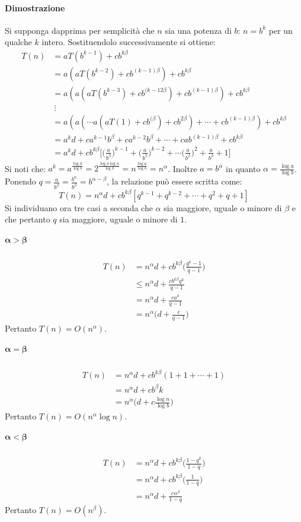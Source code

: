 \paragraph{Dimostrazione}\mbox{}
Si supponga dapprima per semplicit\`a che $n$ sia una potenza di $b$: $n = b^k$ per un qualche $k$ intero. Sostituendolo successivamente si ottiene: 
\begin{align*}
	T(n) &= aT(b^{k-1}) + cb^{k\beta} \\
	     &= a(aT(b^{k-2}) + cb^{(k-1)\beta}) + cb^{k\beta}\\
	     &= a(a(aT(b^{k-3}) + cb^{(k-12\beta}) + cb^{(k-1)\beta}) + cb^{k\beta}\\
	     &\ \vdots \\
	     &= a(a(\cdots a(aT(1) + cb^{(\beta}) + cb^{2\beta})+\cdots+cb^{(k-1)\beta})+cb^{k\beta}\\
	     &= a^kd + ca^{k-1}b^\beta + ca^{k-2}b^\beta + \cdots + cab^{(k-1)\beta} + cb^{k\beta}\\
	     &= a^kd + cb^{k\beta}\biggl[\biggl(\frac{a}{b^\beta}\biggr)^{k-1} + \biggl(\frac{a}{b^\beta}\biggr)^{k-2} + \cdots \biggl(\frac{a}{b^\beta}\biggr)^{2} + \frac{a}{b^\beta} + 1
	     	\biggr]
\end{align*}
Si noti che: $a^k = a^{\frac{\log n}{\log b}}= 2^{\frac{\log a \log n}{\log b}} = n^{\frac{\log a}{\log b}} = n^\alpha$. Inoltre $a = b^\alpha$ in quanto $\alpha = \frac{\log a}{\log b}$.
Ponendo $q = \frac{a}{b^\beta} = \frac{b^\alpha}{b^\beta} = b^{\alpha - \beta}$, la relazione pu\`o essere scritta come: 
$$ T(n) = n^\alpha d + cb^{k\beta}[q^{k-1} + q^{k-2} + \cdots + q^2 + q + 1]$$
Si individuano ora tre casi a seconda che $\alpha$ sia maggiore, uguale o minore di $\beta$ e che pertanto $q$ sia maggiore, uguale o minore di $1$. 
\subparagraph{$\mathbf{\alpha > \beta}$}
\begin{align*}
	T(n) &= n^\alpha d + cb^{k\beta}\biggl(\frac{q^k - 1}{q -1}\biggr)\\
	     &\le n^\alpha d + \frac{cb^{k\beta}q^k}{q-1}\\
	     &= n^\alpha d + \frac{ca^k}{q-1}\\
	     &=  n^\alpha\biggl(d + \frac{c}{q-1}\biggr)
\end{align*}
Pertanto $T(n) = O(n^\alpha)$.
\subparagraph{$\mathbf{\alpha = \beta}$}
\begin{align*}
	T(n) &= n^\alpha d + cb^{k\beta}(1+1+\cdots+1)\\
	     &= n^\alpha d +cb^\beta k\\
	     &= n^\alpha\biggl(d+c\frac{\log n}{\log b}\biggr)
\end{align*}
Pertanto $T(n) = O(n^\alpha\log n)$.
\subparagraph{$\mathbf{\alpha<\beta}$}
\begin{align*}
	T(n) &= n^\alpha d + cb^{k\beta}\biggl(\frac{1-q^k}{1-q}\biggr)\\
	     &= n^\alpha d + cb^{k\beta}\biggl(\frac{1}{1-q}\biggr)\\
	     &=n^\alpha d + \frac{cn^\beta}{1-q}
\end{align*}
Pertanto $T(n) = O(n^\beta)$.
